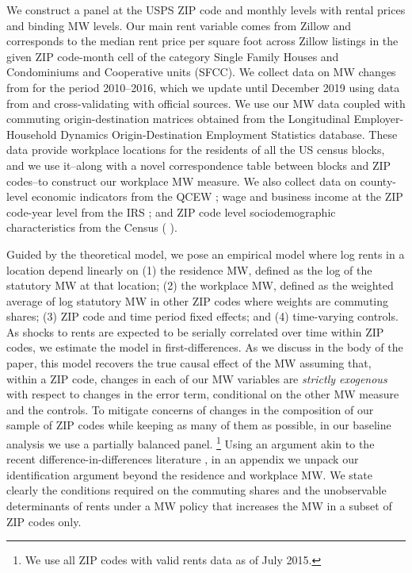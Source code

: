 We construct a panel at the USPS ZIP code and monthly levels with rental prices 
and binding MW levels.
Our main rent variable comes from Zillow and corresponds to the median 
rent price per square foot across Zillow listings in the given ZIP 
code-month cell of the category Single Family Houses and Condominiums and 
Cooperative units (SFCC).
We collect data on MW changes from \textcite{VaghulZipperer2016} for the period 
2010--2016, which we update until December 2019 using data from 
\textcite{BerkeleyLaborCenter} and cross-validating with official sources.
We use our MW data coupled with commuting origin-destination matrices obtained 
from the Longitudinal Employer-Household Dynamics Origin-Destination Employment 
Statistics \parencite[LODES;][]{CensusLODES} database.
These data provide workplace locations for the residents of all the US census 
blocks, and we use it--along with a novel correspondence table between blocks 
and ZIP codes--to construct our workplace MW measure.
We also collect data on 
county-level economic indicators from the QCEW \parencite{QCEW}; 
wage and business income at the ZIP code-year level from the IRS \parencite{IRS}; and 
ZIP code level sociodemographic characteristics from the Census 
(\citeauthor{CensusACS} \cite*{CensusACS, CensusDecennial}).


Guided by the theoretical model, we pose an empirical model where log rents in 
a location depend linearly on
(1) the residence MW, defined as the log of the statutory MW at that location;
(2) the workplace MW, defined as the weighted average of log statutory MW in other 
ZIP codes where weights are commuting shares;
(3) ZIP code and time period fixed effects;
and 
(4) time-varying controls.
As shocks to rents are expected to be serially correlated over time within ZIP 
codes, we estimate the model in first-differences.
As we discuss in the body of the paper, this model recovers the true causal 
effect of the MW assuming that, within a ZIP code, changes in each of our MW 
variables are \textit{strictly exogenous} with respect to changes in the error 
term, conditional on the other MW measure and the controls.
To mitigate concerns of changes in the composition of our sample of ZIP codes 
while keeping as many of them as possible, in our baseline analysis we use a 
partially balanced panel.%
\footnote{We use all ZIP codes with valid rents data as of July 2015.}
Using an argument akin to the recent difference-in-differences literature
\parencite[e.g.,][]{CallawayEtAl2021}, 
in an appendix we unpack our identification argument beyond the residence and
workplace MW. 
We state clearly the conditions required on the commuting shares and the 
unobservable determinants of rents under a MW policy that increases the MW in 
a subset of ZIP codes only.

